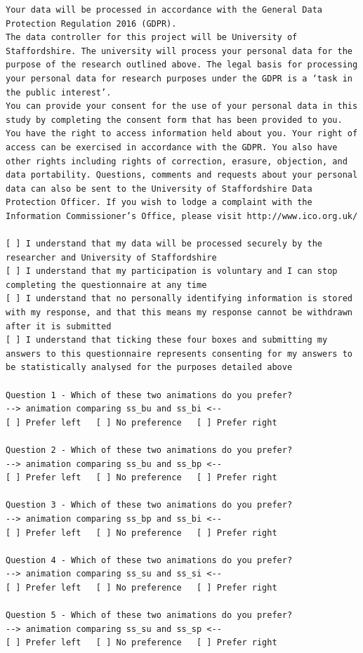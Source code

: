 \documentclass[]{article}
\begin{document}
\begin{Verbatim}[breaklines]
Your data will be processed in accordance with the General Data Protection Regulation 2016 (GDPR).
The data controller for this project will be University of Staffordshire. The university will process your personal data for the purpose of the research outlined above. The legal basis for processing your personal data for research purposes under the GDPR is a ‘task in the public interest’.
You can provide your consent for the use of your personal data in this study by completing the consent form that has been provided to you.
You have the right to access information held about you. Your right of access can be exercised in accordance with the GDPR. You also have other rights including rights of correction, erasure, objection, and data portability. Questions, comments and requests about your personal data can also be sent to the University of Staffordshire Data Protection Officer. If you wish to lodge a complaint with the Information Commissioner’s Office, please visit http://www.ico.org.uk/

[ ] I understand that my data will be processed securely by the researcher and University of Staffordshire
[ ] I understand that my participation is voluntary and I can stop completing the questionnaire at any time
[ ] I understand that no personally identifying information is stored with my response, and that this means my response cannot be withdrawn after it is submitted
[ ] I understand that ticking these four boxes and submitting my answers to this questionnaire represents consenting for my answers to be statistically analysed for the purposes detailed above

Question 1 - Which of these two animations do you prefer?
--> animation comparing ss_bu and ss_bi <--
[ ] Prefer left   [ ] No preference   [ ] Prefer right

Question 2 - Which of these two animations do you prefer?
--> animation comparing ss_bu and ss_bp <--
[ ] Prefer left   [ ] No preference   [ ] Prefer right

Question 3 - Which of these two animations do you prefer?
--> animation comparing ss_bp and ss_bi <--
[ ] Prefer left   [ ] No preference   [ ] Prefer right

Question 4 - Which of these two animations do you prefer?
--> animation comparing ss_su and ss_si <--
[ ] Prefer left   [ ] No preference   [ ] Prefer right

Question 5 - Which of these two animations do you prefer?
--> animation comparing ss_su and ss_sp <--
[ ] Prefer left   [ ] No preference   [ ] Prefer right


\end{Verbatim}
\end{document}
